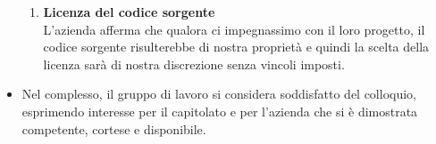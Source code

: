 \documentclass[a4paper, 12pt]{article}
\begin{document}
\begin{itemize}
\begin{enumerate}
        \item \textbf{Licenza del codice sorgente} \\ L'azienda afferma che qualora ci impegnassimo con il loro progetto, il codice sorgente risulterebbe di nostra proprietà e quindi la scelta della licenza sarà di nostra discrezione senza vincoli imposti.
    \end{enumerate}
    \item Nel complesso, il gruppo di lavoro si considera soddisfatto del colloquio, esprimendo interesse per il capitolato e per l'azienda che si è dimostrata competente, cortese e disponibile.
\end{itemize}
\end{document}
